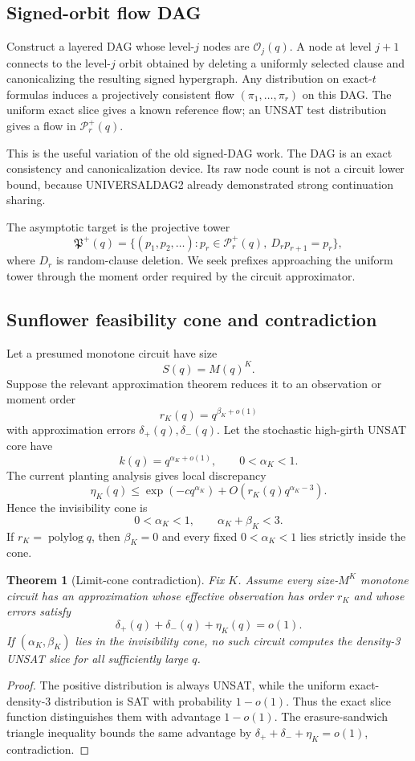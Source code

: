 \documentclass[11pt]{article}
\newtheorem{theorem}{Theorem}
\begin{document}
\subsection{Signed-orbit flow DAG}
Construct a layered DAG whose level-$j$ nodes are $\mathcal O_j(q)$. A node at level $j+1$ connects to the level-$j$ orbit obtained by deleting a uniformly selected clause and canonicalizing the resulting signed hypergraph. Any distribution on exact-$t$ formulas induces a projectively consistent flow $(\pi_1,\ldots,\pi_r)$ on this DAG. The uniform exact slice gives a known reference flow; an UNSAT test distribution gives a flow in $\mathcal P_r^+(q)$.

This is the useful variation of the old signed-DAG work. The DAG is an exact consistency and canonicalization device. Its raw node count is not a circuit lower bound, because UNIVERSALDAG2 already demonstrated strong continuation sharing.

The asymptotic target is the projective tower
\[
\mathfrak P^+(q)=\{(p_1,p_2,\ldots): p_r\in\mathcal P_r^+(q),\ D_r p_{r+1}=p_r\},
\]
where $D_r$ is random-clause deletion. We seek prefixes approaching the uniform tower through the moment order required by the circuit approximator.

\subsection{Sunflower feasibility cone and contradiction}
Let a presumed monotone circuit have size
\[
S(q)=M(q)^K.
\]
Suppose the relevant approximation theorem reduces it to an observation or moment order
\[
r_K(q)=q^{\beta_K+o(1)}
\]
with approximation errors $\delta_+(q),\delta_-(q)$. Let the stochastic high-girth UNSAT core have
\[
k(q)=q^{\alpha_K+o(1)},\qquad0<\alpha_K<1.
\]
The current planting analysis gives local discrepancy
\[
\eta_K(q)
\le
\exp(-c q^{\alpha_K})+O\left(r_K(q)q^{\alpha_K-3}\right).
\]
Hence the invisibility cone is
\[
\boxed{0<\alpha_K<1,\qquad \alpha_K+\beta_K<3.}
\]
If $r_K=\operatorname{polylog}q$, then $\beta_K=0$ and every fixed $0<\alpha_K<1$ lies strictly inside the cone.

\begin{theorem}[Limit-cone contradiction]
Fix $K$. Assume every size-$M^K$ monotone circuit has an approximation whose effective observation has order $r_K$ and whose errors satisfy
\[
\delta_+(q)+\delta_-(q)+\eta_K(q)=o(1).
\]
If $(\alpha_K,\beta_K)$ lies in the invisibility cone, no such circuit computes the density-3 UNSAT slice for all sufficiently large $q$.
\end{theorem}
\begin{proof}
The positive distribution is always UNSAT, while the uniform exact-density-3 distribution is SAT with probability $1-o(1)$. Thus the exact slice function distinguishes them with advantage $1-o(1)$. The erasure-sandwich triangle inequality bounds the same advantage by $\delta_++\delta_-+\eta_K=o(1)$, contradiction.
\end{proof}
\end{document}
